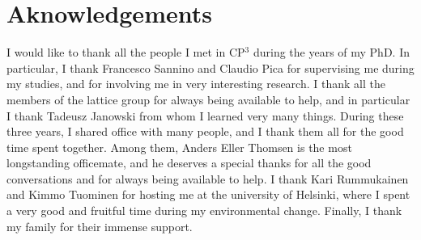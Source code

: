\chapter*{Aknowledgements}

I would like to thank all the people I met in CP$^3$ during the years of my PhD. In particular, I thank Francesco Sannino and Claudio Pica for supervising me during my studies, and for involving me in very interesting research. I thank all the members of the lattice group for always being available to help, and in particular I thank Tadeusz Janowski from whom I learned very many things. During these three years, I shared office with many people, and I thank them all for the good time spent together. Among them, Anders Eller Thomsen is the most longstanding officemate, and he deserves a special thanks for all the good conversations and for always being available to help. I thank Kari Rummukainen and Kimmo Tuominen for hosting me at the university of Helsinki, where I spent a very good and fruitful time during my environmental change. Finally, I thank my family for their immense support.